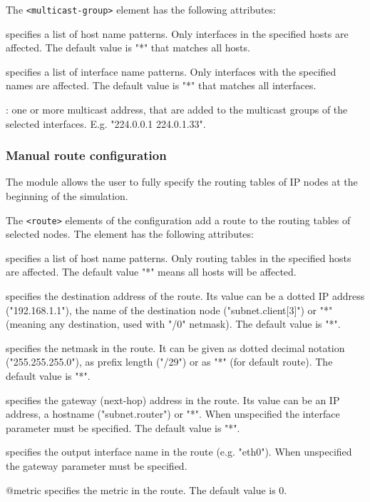 The \verb!<multicast-group>! element has the following attributes:
\begin{compactitem}
  \item {} specifies a list of host name patterns.
     Only interfaces in the specified hosts are affected. The default value
     is "*" that matches all hosts.

  \item {} specifies a list of interface name patterns.
     Only interfaces with the specified names are affected. The
     default value is "*" that matches all interfaces.

  \item {}: one or more multicast address, that are added
     to the multicast groups of the selected interfaces.
     E.g. "224.0.0.1 224.0.1.33".
\end{compactitem}


\subsubsection*{Manual route configuration}

The  module allows the user
to fully specify the routing tables of IP nodes at the beginning
of the simulation.

The \verb!<route>! elements of the configuration add a route to the
routing tables of selected nodes. The element has the following attributes:
\begin{compactitem}
 \item {} specifies a list of host name patterns.
   Only routing tables in the specified hosts are affected. The default
   value "*" means all hosts will be affected.

 \item {} specifies the destination address of the route.
   Its value can be a dotted IP address ("192.168.1.1"), the name of
   the destination node ("subnet.client[3]") or "*"
   (meaning any destination, used with "/0" netmask).
   The default value is "*".

 \item {} specifies the netmask in the route.
   It can be given as dotted decimal notation ("255.255.255.0"),
   as prefix length ("/29") or as "*" (for default route).
   The default value is "*".

 \item {} specifies the gateway (next-hop) address in the route.
   Its value can be an IP address, a hostname ("subnet.router") or "*".
   When unspecified the interface parameter must be specified.
   The default value is "*".

 \item {} specifies the output interface name in the route (e.g. "eth0").
   When unspecified the gateway parameter must be specified.

 \item[@metric] specifies the metric in the route. The default value is 0.
\end{compactitem}

